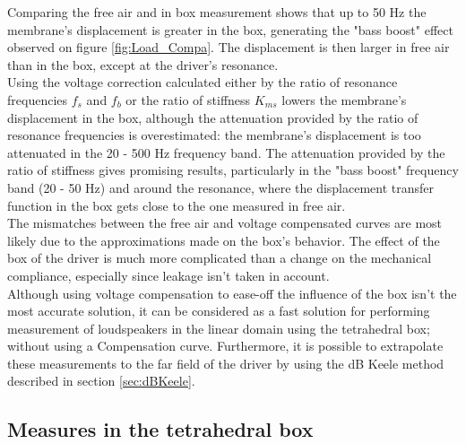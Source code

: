 \documentclass{report}
\begin{document}
Comparing the free air and in box measurement shows that up to 50 Hz the membrane's displacement is greater in the box, generating the "bass boost" effect observed on figure \ref{fig:Load_Compa}. The displacement is then larger in free air than in the box, except at the driver's resonance.\\
Using the voltage correction calculated either by the ratio of resonance frequencies $f_{s}$ and $f_{b}$ or the ratio of stiffness $K_{ms}$ lowers the membrane's displacement in the box, although the attenuation provided by the ratio of resonance frequencies is overestimated: the membrane's displacement is too attenuated in the 20 - 500 Hz frequency band. The attenuation provided by the ratio of stiffness gives promising results, particularly in the "bass boost" frequency band (20 - 50 Hz) and around the resonance, where the displacement transfer function in the box gets close to the one measured in free air. \\

The mismatches between the free air and voltage compensated curves are most likely due to the approximations made on the box's behavior. The effect of the box of the driver is much more complicated than a change on the mechanical compliance, especially since leakage isn't taken in account.  \\

Although using voltage compensation to ease-off the influence of the box isn't the most accurate solution, it can be considered as a fast solution for performing measurement of loudspeakers in the linear domain using the tetrahedral box; without using a Compensation curve. Furthermore, it is possible to extrapolate these measurements to the far field of the driver by using the dB Keele method described in section \ref{sec:dBKeele}.

\subsection{Measures in the tetrahedral box}
\end{document}
